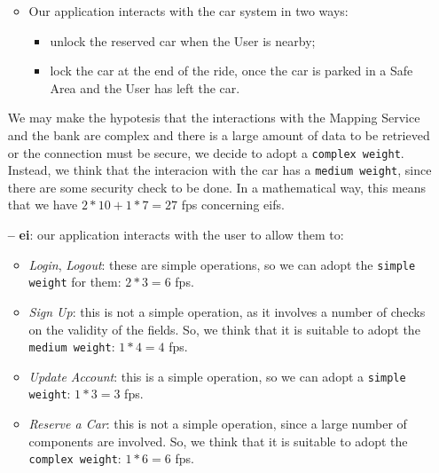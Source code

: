 \begin{itemize}
\begin{itemize}
\begin{itemize}
	\end{itemize}


\item Our application interacts with the car system in two ways:

	\begin{itemize}

	\item unlock the reserved car when the User is nearby;
	
	\item lock the car at the end of the ride, once the car is parked in a Safe Area and the User has left the car.

	\end{itemize}

\end{itemize}

We may make the hypotesis that the interactions with the Mapping Service and the bank are complex and there is a large amount of data to be retrieved or the connection must be secure, we decide to adopt a \texttt{complex weight}. 
Instead, we think that the interacion with the car has a \texttt{medium weight}, since there are some security check to be done.
In a mathematical way, this means that we have $2 * 10 + 1 *  7 = 27$ \acs{fp}s concerning \acs{eif}s.

\item[\textbf{--}] \textbf{\acl{ei}}: our application interacts with the user to allow them to:
	\begin{itemize}

	\item \textit{Login}, \textit{Logout}: these are simple operations, so we can adopt the \texttt{simple weight} for them: $2 * 3 = 6$ \acs{fp}s.
	
	\item \textit{Sign Up}: this is not a simple operation, as it involves a number of checks on the validity of the fields. So, we think that it is suitable to adopt the \texttt{medium weight}: $1 * 4 = 4$ \acs{fp}s.
	
	\item \textit{Update Account}: this is a simple operation, so we can adopt a \texttt{simple weight}: $1 * 3 = 3$ \acs{fp}s.

	\item \textit{Reserve a Car}: this is not a simple operation, since a large number of components are involved. So, we think that it is suitable to adopt the \texttt{complex weight}: $1 * 6 = 6$ \acs{fp}s.
	

\end{itemize}
\end{itemize}
